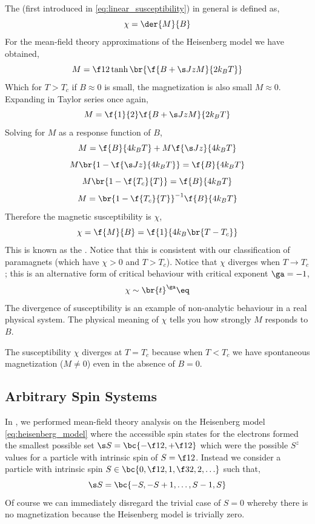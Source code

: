 \documentclass{article}
\begin{document}
The  (first introduced in \cref{eq:linear_susceptibility}) in general is defined as,
\[ \chi = \der{M}{B} \]
For the mean-field theory approximations of the Heisenberg model we have obtained,
\[ M = \f12 \tanh \br{\f{B + \s J z M}{2 k_B T}} \]
Which for $T > T_c$ if $B \approx 0$ is small, the magnetization is also small $M \approx 0$. Expanding in Taylor series once again,
\[ M = \f{1}{2} \f{B + \s J z M}{2 k_B T} \]
Solving for $M$ as a response function of $B$,
\[ M = \f{B}{4 k_B T} + M \f{\s J z}{4 k_B T} \]
\[ M\br{1- \f{\s J z}{4 k_B T}} = \f{B}{4 k_B T} \]
\[ M\br{1- \f{T_c}{T}} = \f{B}{4 k_B T} \]
\[ M = \br{1- \f{T_c}{T}}^{-1}\f{B}{4 k_B T} \]
Therefore the magnetic susceptibility is $\chi$,
\[ \chi = \f{M}{B} = \f{1}{4 k_B \br{T- T_c}} \]
This is known as the . Notice that this is consistent with our classification of paramagnets (which have $\chi > 0$ and $T > T_c$). Notice that $\chi$ diverges when $T \to T_c$; this is an alternative form of critical behaviour with critical exponent $\ga = -1$,
\[ \chi \sim \br{t}^{\ga} \eq \label{eq:sus_crit_exp} \]
The divergence of susceptibility is an example of non-analytic behaviour in a real physical system. The physical meaning of $\chi$ tells you how strongly $M$ responds to $B$.
\begin{center}
\end{center}
The susceptibility $\chi$ diverges at $T = T_c$ because when $T < T_c$ we have spontaneous magnetization ($M \neq 0$) even in the absence of $B = 0$.

\subsection{Arbitrary Spin Systems}

In \label{sec:mft}, we performed mean-field theory analysis on the Heisenberg model \cref{eq:heisenberg_model} where the accessible spin states for the electrons formed the smallest possible set $\s S = \bc{-\f12, +\f12}$ which were the possible $S^{z}$ values for a particle with intrinsic spin of $S = \f12$. Instead we consider a particle with intrinsic spin $S \in \bc{0, \f12, 1, \f32, 2, \ldots}$ such that,
\[ \s S = \bc{-S, -S + 1, \ldots, S - 1, S} \]
Of course we can immediately disregard the trivial case of $S = 0$ whereby there is no magnetization because the Heisenberg model is trivially zero. \\
\end{document}
